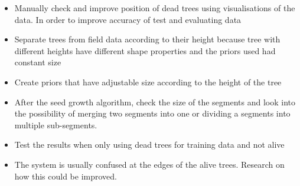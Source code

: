 \documentclass{subfiles}
\begin{document}
\begin{itemize}
	\item Manually check and improve position of dead trees using visualisations of the data. In order to improve accuracy of test and evaluating data
	\item Separate trees from field data according to their height because tree with different heights have different shape properties and the priors used had constant size
	\item Create priors that have adjustable size according to the height of the tree	
	\item After the seed growth algorithm, check the size of the segments and look into the possibility of merging two segments into one or dividing a segments into multiple sub-segments.
	\item Test the results when only using dead trees for training data and not alive
	\item The system is usually confused at the edges of the alive trees. Research on how this could be improved. 
\end{itemize}
\end{document}

